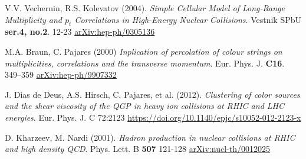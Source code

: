 \begin{thebibliography}{24}
V.V. Vechernin, R.S. Kolevatov (2004).
\textit{Simple Cellular Model of Long-Range Multiplicity and $p_t$ Correlations in High-Energy Nuclear Collisions}.
Vestnik SPbU
\textbf{ser.4, no.2}.
12-23
\href{https://arxiv.org/abs/hep-ph/0305136}{arXiv:hep-ph/0305136}

M.A. Braun, C. Pajares (2000)
\textit{Inplication of percolation of colour strings on multiplicities, correlations and the transverse momentum}.
Eur. Phys. J.
\textbf{C16}.
349–359
\href{https://arxiv.org/abs/hep-ph/9907332v1}{arXiv:hep-ph/9907332}

J. Dias de Deus, A.S. Hirsch, C. Pajares, et al. (2012).
\textit{Clustering of color sources and the shear viscosity of the QGP in heavy ion collisions at RHIC and LHC energies}.
Eur. Phys. J. C 72:2123
\url{https://doi.org/10.1140/epjc/s10052-012-2123-x}

D. Kharzeev, M. Nardi (2001).
\textit{Hadron production in nuclear collisions at RHIC and high density QCD}.
Phys. Lett. B
\textbf{507}
121-128
\href{https://arxiv.org/abs/nucl-th/0012025}{arXiv:nucl-th/0012025}

\end{thebibliography}